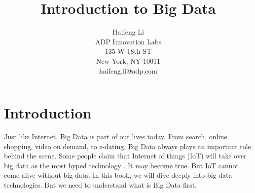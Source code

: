 \documentclass[12pt]{book}
\begin{document}


\title{Introduction to Big Data}

\author{Haifeng Li\\ADP Innovation Labs\\135 W 18th ST\\New York, NY 10011\\haifeng.li@adp.com}



\frontmatter                            %
\maketitle                              %
\tableofcontents                        %
\mainmatter   


\chapter[Introduction]
{Introduction}
Just like Internet, Big Data is part of our lives today. From search, online shopping, video on demand, to e-dating, Big Data always plays an important role behind the scene.
Some people claim that Internet of things (IoT) will take over big data as the most hyped technology \cite{Gartner2014}. It may become true. But IoT cannot come alive without big data.
In this book, we will dive deeply into big data technologies. But we need to understand what is Big Data first.
\end{document}
